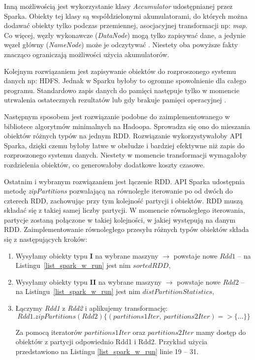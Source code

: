 \documentclass[magisterska]{pracamgr}
\begin{document}
Inną możliwością jest wykorzystanie klasy \textit{Accumulator} udostępnianej przez Sparka. Obiekty tej klasy są współdzielonymi akumulatorami, do których można dodawać obiekty tylko podczas przemiennej, asocjacyjnej transformacji np: \textit{map}. Co więcej, węzły wykonawcze (\textit{DataNode}) mogą tylko zapisywać dane, a jedynie węzeł główny (\textit{NameNode}) może je odczytywać \cite{spark_documentation}. Niestety oba powyższe fakty znacząco ograniczają możliwości użycia akumulatorów.

Kolejnym rozwiązaniem jest zapisywanie obiektów do rozproszonego systemu danych np: HDFS. Jednak w Sparku byłoby to ogromne spowolnienie dla całego programu. Standardowo zapis danych do pamięci następuje tylko w momencie utrwalenia ostatecznych rezultatów lub gdy brakuje pamięci operacyjnej \cite{zaharia2010spark}.

Następnym sposobem jest rozwiązanie podobne do zaimplementowanego w bibliotece algorytmów minimalnych na Hadoopa. Sprowadza się ono do mieszania obiektów różnych typów na jednym RDD. Rozwiązanie wykorzystywałoby API Sparka, dzięki czemu byłoby łatwe w obsłudze i bardziej efektywne niż zapis do rozproszonego systemu danych. Niestety w momencie transformacji wymagałoby rozdzielenia obiektów, co generowałoby dodatkowe koszty czasowe.

Ostatnim i wybranym rozwiązaniem jest łączenie RDD. API Sparka udostępnia metodę \mbox{\textit{zipPartitions}} pozwalającą na równoległe iterowanie po od dwóch do czterech RDD, zachowując przy tym kolejność partycji i obiektów. RDD muszą składać się z takiej samej liczby partycji. W momencie równoległego iterowania, partycje zostaną połączone w takiej kolejności, w jakiej występują na danym RDD. Zaimplementowanie równoległego przesyłu różnych typów obiektów składa się z następujących kroków:
\begin{enumerate}
    \item Wysyłamy obiekty typu \textbf{I} na wybrane maszyny $\rightarrow$ powstaje nowe \(Rdd1\) -- na \mbox{Listingu \ref{list_spark_w_run}} jest nim \(sortedRDD\),
    \item Wysyłamy obiekty typu \textbf{II} na wybrane maszyny $\rightarrow$ powstaje nowe \(Rdd2\) -- na \mbox{Listingu \ref{list_spark_w_run}} jest nim \(distPartitionStatistics\),
    \item Łączymy \textit{Rdd1} z \textit{Rdd2} i aplikujemy transformację:
    $$Rdd1.zipPartitions(Rdd2)\{(partitions1Iter, \ partitions2Iter) => \{ ... \}\}$$
    
    Za pomocą iteratorów \(partitions1Iter\) oraz \(partitions2Iter\) mamy dostęp do obiektów z partycji odpowiednio Rdd1 i Rdd2. Przykład użycia przedstawiono na Listingu \ref{list_spark_w_run} linie 19 -- 31.
\end{enumerate}
\end{document}
